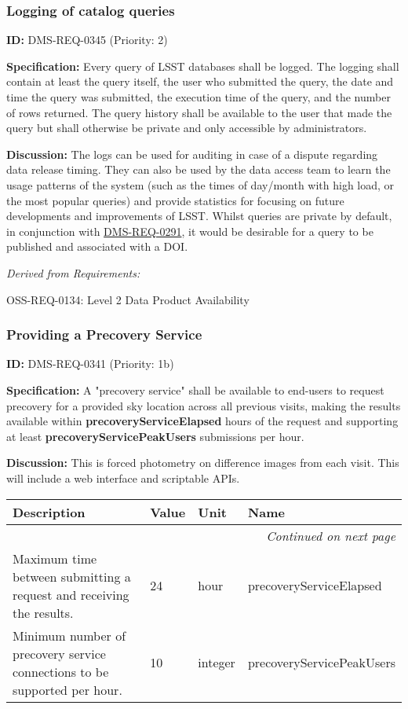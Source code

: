 \documentclass[SE,toc,lsstdraft]{lsstdoc}
\makeatletter
\newcommand{\paramname}[1]{\hspace{0pt}#1}
\newcommand{\unitname}[1]{\hspace{0pt}#1}
\newenvironment{parameters}[0]{%
\setlength\LTleft{0pt}
\setlength\LTright{\fill}
\begin{small}
\begin{longtable}[]{|p{0.49\textwidth}|l|p{0.6in}|p{1.70in}@{}|}

\hline \textbf{Description} & \textbf{Value} & \textbf{Unit} & \textbf{Name} \\ \hline
\endhead

\hline \multicolumn{4}{r}{\emph{Continued on next page}} \\
\endfoot

\hline\hline
\endlastfoot
}{%
\hline
\end{longtable}
\end{small}
}
\makeatother
\begin{document}
\subsubsection{Logging of catalog queries}

\label{DMS-REQ-0345}
\textbf{ID:} DMS-REQ-0345 (Priority: 2)

    \textbf{Specification: }Every query of LSST databases shall be logged. The logging shall contain at least the query itself, the user who submitted the query, the date and time the query was submitted, the execution time of the query, and the number of rows returned. The query history shall be available to the user that made the query but shall otherwise be private and only accessible by administrators.

    \textbf{Discussion: }The logs can be used for auditing in case of a dispute regarding data release timing. They can also be used by the data access team to learn the usage patterns of the system (such as the times of day/month with high load, or the most popular queries) and provide statistics for focusing on future developments and improvements of LSST. Whilst queries are private by default, in conjunction with \hyperref[DMS-REQ-0291]{DMS-REQ-0291}, it would be desirable for a query to be published and associated with a DOI.

\emph{Derived from Requirements:}

OSS-REQ-0134:
Level 2 Data Product Availability \newline

\subsubsection{Providing a Precovery Service}

\label{DMS-REQ-0341}
\textbf{ID:} DMS-REQ-0341 (Priority: 1b)

\textbf{Specification:} A "precovery service" shall be available to end-users to request precovery for a provided sky location across all previous visits, making the results available within \textbf{precoveryServiceElapsed} hours of the request and supporting at least\textbf{ precoveryServicePeakUsers} submissions per hour.

\textbf{Discussion:} This is forced photometry on difference images from each visit. This will include a web interface and scriptable APIs.

\begin{parameters}
Maximum time between submitting a request and receiving the results.
&
24
&
\unitname{%
hour
}
&
\paramname{%
precoveryServiceElapsed
} \\\hline
Minimum number of precovery service connections to be supported per hour.
&
10
&
\unitname{%
integer
}
&
\paramname{%
precoveryServicePeakUsers
} \\\hline
\end{parameters}
\end{document}
